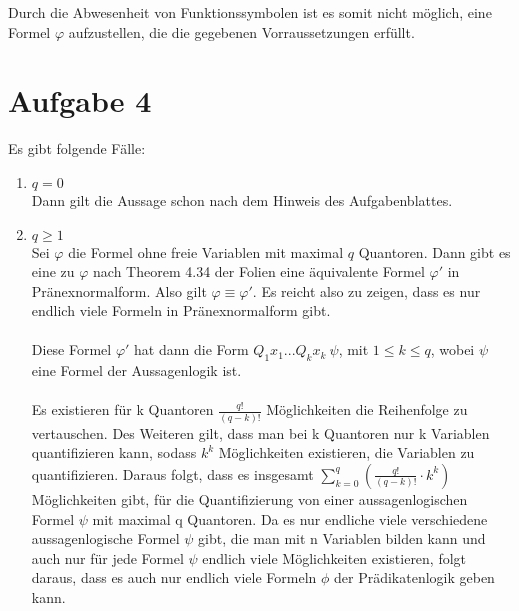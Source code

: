\documentclass[a4paper,10pt]{article}
\begin{document}
\begin{enumerate}[(i)]
Durch die Abwesenheit von Funktionssymbolen ist es somit nicht möglich, eine Formel $\varphi$ aufzustellen, die die gegebenen Vorraussetzungen erfüllt.


\end{enumerate}

\section*{Aufgabe 4}
Es gibt folgende Fälle:
\begin{enumerate}
\item{$q = 0$}\\
Dann gilt die Aussage schon nach dem Hinweis des Aufgabenblattes.
\item{$q \ge 1$}\\
Sei $\varphi$ die Formel ohne freie Variablen mit maximal $q$ Quantoren. Dann gibt es eine zu $\varphi$ nach Theorem 4.34 der Folien eine äquivalente Formel $\varphi'$ in Pränexnormalform. Also gilt $\varphi \equiv \varphi'$. Es reicht also zu zeigen, dass es nur endlich viele Formeln in Pränexnormalform gibt.
\\\\
Diese Formel $\varphi'$ hat dann die Form $Q_1x_1...Q_kx_k\ \psi$, mit $1 \le k \le q$, wobei $\psi$ eine Formel der Aussagenlogik ist.
\\\\
Es existieren für k Quantoren $\frac{q!}{(q - k)!}$ Möglichkeiten die Reihenfolge zu vertauschen.  Des Weiteren gilt, dass man bei k Quantoren nur k Variablen quantifizieren kann, sodass $k^k$ Möglichkeiten existieren, die Variablen zu quantifizieren. Daraus folgt, dass es insgesamt $\sum\limits_{k=0}^q (\frac{q!}{(q - k)!} \cdot k^k)$ Möglichkeiten gibt, für die Quantifizierung von einer aussagenlogischen Formel $\psi$ mit maximal q Quantoren. Da es nur endliche viele verschiedene aussagenlogische Formel $\psi$ gibt, die man mit n Variablen bilden kann und auch nur für jede Formel $\psi$ endlich viele Möglichkeiten existieren, folgt daraus, dass es auch nur endlich viele Formeln $\phi$ der Prädikatenlogik geben kann.
\end{enumerate}
\end{document}
